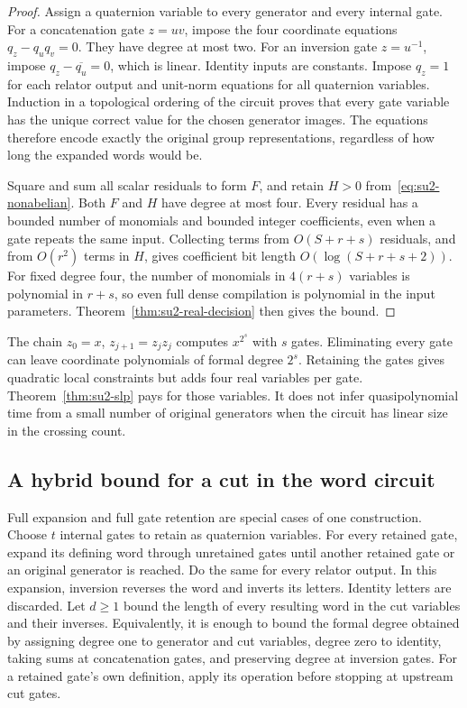\begin{proof}
Assign a quaternion variable to every generator and every internal gate.
For a concatenation gate $z=uv$, impose the four coordinate equations
$q_z-q_uq_v=0$.  They have degree at most two.  For an inversion gate
$z=u^{-1}$, impose $q_z-\overline{q_u}=0$, which is linear.
Identity inputs are constants.  Impose $q_z=1$ for each relator output
and unit-norm equations for all quaternion variables.  Induction in a
topological ordering of the circuit proves that every gate variable has
the unique correct value for the chosen generator images.  The equations
therefore encode exactly the original group representations, regardless
of how long the expanded words would be.

Square and sum all scalar residuals to form $F$, and retain
$H>0$ from~\eqref{eq:su2-nonabelian}.  Both $F$ and $H$ have degree at
most four.  Every residual has a bounded number of monomials and bounded
integer coefficients, even when a gate repeats the same input.  Collecting
terms from $O(S+r+s)$ residuals, and from $O(r^2)$ terms in $H$, gives
coefficient bit length $O(\log(S+r+s+2))$.
For fixed degree four, the number of monomials in $4(r+s)$ variables is
polynomial in $r+s$, so even full dense compilation is polynomial in the
input parameters.  Theorem~\ref{thm:su2-real-decision} then gives the bound.
\end{proof}

\begin{remark}
The chain $z_0=x$, $z_{j+1}=z_jz_j$ computes $x^{2^s}$ with $s$ gates.
Eliminating every gate can leave coordinate polynomials of formal degree
$2^s$.  Retaining the gates gives quadratic local constraints but adds
four real variables per gate.  Theorem~\ref{thm:su2-slp} pays for those
variables.  It does not infer quasipolynomial time from a small number of
original generators when the circuit has linear size in the crossing count.
\end{remark}

\subsection{A hybrid bound for a cut in the word circuit}

Full expansion and full gate retention are special cases of one construction.
Choose $t$ internal gates to retain as quaternion variables.  For every
retained gate, expand its defining word through unretained gates until
another retained gate or an original generator is reached.  Do the same
for every relator output.  In this expansion, inversion reverses the word
and inverts its letters.  Identity letters are discarded.  Let $d\geq1$
bound the length of every resulting word in the cut variables and their
inverses.  Equivalently, it is enough to bound the formal degree obtained
by assigning degree one to generator and cut variables, degree zero to
identity, taking sums at concatenation gates, and preserving degree at
inversion gates.  For a retained gate's own definition, apply its operation
before stopping at upstream cut gates.

